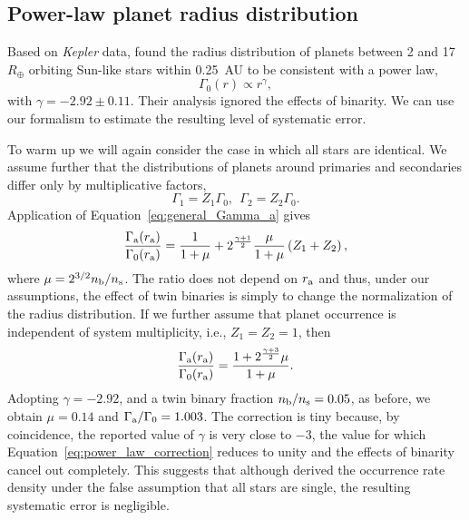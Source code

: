 \documentclass[12pt,modern,trackchanges]{aastex61}
\renewcommand{\a}{_{\rm a}}
\newcommand{\s}{_{\rm s}}
\renewcommand{\b}{_{\rm b}}
\begin{document}
\subsection{Power-law planet radius distribution}
\label{sec:model_2}

Based on {\it Kepler} data, \citet{howard_planet_2012} found the
radius distribution of planets between 2 and 17~$R_\oplus$ orbiting Sun-like
stars within 0.25\, AU to be consistent with a power law,
\begin{equation}
  \Gamma_0(r) \propto r^\gamma,
\label{eqn:power_law}
\end{equation}
with $\gamma=-2.92\pm 0.11$.  Their analysis ignored the effects of
binarity.  We can use our formalism to estimate the resulting level of
systematic error.

To warm up we will again consider the case in which all stars are
identical.  We assume further that the distributions of planets around
primaries and secondaries differ only by multiplicative factors,
\begin{equation}
    \Gamma_1 = Z_1 \Gamma_0,~~\Gamma_2 = Z_2 \Gamma_0.
\end{equation}
Application of Equation~\ref{eq:general_Gamma_a} gives
\begin{equation}
    \frac{\Gamma\a(r\a)}{\Gamma_0(r\a)} = 
    \frac{1}{1+\mu}
    +
    2^{\frac{\gamma+1}{2} } \frac{\mu}{1+\mu} \left(Z_1 + Z_2\right),
    \label{eq:model5_apparent_rate_density}
\end{equation}
where $\mu = 2^{3/2} n\b/n\s$.  The ratio does not depend on $r\a$ and
thus, under our assumptions, the effect of twin binaries is simply to
change the normalization of the radius distribution.  If we further
assume that planet occurrence is independent of system multiplicity,
i.e., $Z_1=Z_2=1$, then
\begin{equation}
    \frac{\Gamma\a(r\a)}{\Gamma_0(r\a)} = 
    \frac{1 + 2^{\frac{\gamma+3}{2}}\mu}{1 + \mu}.
    \label{eq:power_law_correction}
\end{equation}
Adopting $\gamma=-2.92$, and a twin binary fraction $n\b/n\s=0.05$, as
before, we obtain $\mu = 0.14$ and $\Gamma\a/\Gamma_0 = 1.003$.  The
correction is tiny because, by coincidence, the reported value of
$\gamma$ is very close to $-3$, the value for which
Equation~\ref{eq:power_law_correction} reduces to unity and the
effects of binarity cancel out completely.  This suggests that
although \citet{howard_planet_2012} derived the occurrence rate
density under the false assumption that all stars are single, the
resulting systematic error is negligible.
\end{document}
